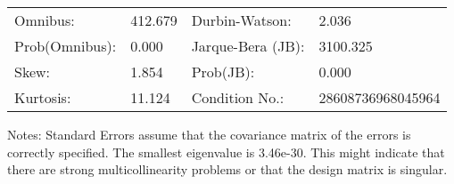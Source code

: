 \begin{table}
\begin{center}
\begin{tabular}{llll}
\hline
Omnibus:       & 412.679 & Durbin-Watson:    & 2.036              \\
Prob(Omnibus): & 0.000   & Jarque-Bera (JB): & 3100.325           \\
Skew:          & 1.854   & Prob(JB):         & 0.000              \\
Kurtosis:      & 11.124  & Condition No.:    & 28608736968045964  \\
\hline
\end{tabular}
\end{center}
\end{table}
\bigskip
Notes: \newline 
[1] Standard Errors assume that the covariance matrix of the errors is correctly specified. \newline 
[2] The smallest eigenvalue is 3.46e-30. This might indicate that                there are strong multicollinearity problems or that the design                matrix is singular.